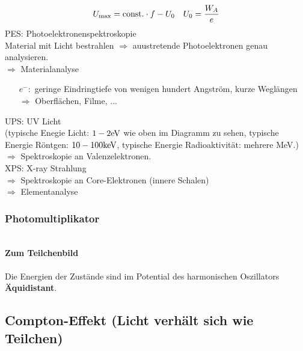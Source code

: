 \begin{equation*}
U_{\textrm{max}} = \textrm{const.} \cdot f - U_0 \quad U_0 = \frac{W_A}{e}
\end{equation*}
PES: Photoelektronenspektroskopie\\[5pt]
Material mit Licht bestrahlen $ \Rightarrow $ auustretende Photoelektronen genau analysieren.\\
$ \Rightarrow $ Materialanalyse
\begin{itemize}
	\item[$ e^-: $] geringe Eindringtiefe von wenigen hundert Angström, kurze Weglängen $ \Rightarrow $ Oberflächen, Filme, ...
\end{itemize}
UPS: UV Licht\\
(typische Enegie Licht: $ 1-2 \textrm{eV} $ wie oben im Diagramm zu sehen,
typische Energie Röntgen: $ 10-100 \textrm{keV} $,
typische Energie Radioaktivität: mehrere MeV.)\\
$ \Rightarrow $ Spektroskopie an Valenzelektronen.\\[5pt]
XPS: X-ray Strahlung\\
$ \Rightarrow $ Spektroskopie an Core-Elektronen (innere Schalen)\\
$ \Rightarrow $ Elementanalyse\\

\subsubsection{Photomultiplikator}

\\
\textbf{Zum Teilchenbild}\\
\\
Die Energien der Zustände sind im Potential des harmonischen Oszillators \textbf{Äquidistant}.

\subsection{Compton-Effekt (Licht verhält sich wie Teilchen)}

